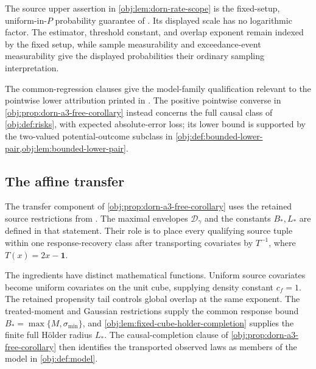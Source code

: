 
The source upper assertion in \cref{obj:lem:dorn-rate-scope} is the fixed-setup, uniform-in-\(P\) probability guarantee of \citet[Theorem 1(ii), author PDF p.~12; proof of Theorem 1, pp.~27--28]{Dorn2026GlobalOverlap}. Its displayed scale has no logarithmic factor. The estimator, threshold constant, and overlap exponent remain indexed by the fixed setup, while sample measurability and exceedance-event measurability give the displayed probabilities their ordinary sampling interpretation.

The common-regression clauses give the model-family qualification relevant to the pointwise lower attribution printed in \citet[Theorem 1(i), author PDF p.~12]{Dorn2026GlobalOverlap}. The positive pointwise converse in \cref{obj:prop:dorn-a3-free-corollary} instead concerns the full causal class of \cref{obj:def:risks}, with expected absolute-error loss; its lower bound is supported by the two-valued potential-outcome subclass in \cref{obj:def:bounded-lower-pair,obj:lem:bounded-lower-pair}.

\subsection{The affine transfer}

The transfer component of \cref{obj:prop:dorn-a3-free-corollary} uses the retained source restrictions from \citet[Section 2, Assumptions 1--2, author PDF pp.~3--7]{Dorn2026GlobalOverlap}. The maximal envelopes \(\mathcal D_\gamma\) and the constants \(B_*,L_*\) are defined in that statement. Their role is to place every qualifying source tuple within one response-recovery class after transporting covariates by \(T^{-1}\), where \(T(x)=2x-\mathbf1\).

The ingredients have distinct mathematical functions. Uniform source covariates become uniform covariates on the unit cube, supplying density constant \(c_f=1\). The retained propensity tail controls global overlap at the same exponent. The treated-moment and Gaussian restrictions supply the common response bound \(B_*=\max\{M,\sigma_{\min}\}\), and \cref{obj:lem:fixed-cube-holder-completion} supplies the finite full Hölder radius \(L_*\). The causal-completion clause of \cref{obj:prop:dorn-a3-free-corollary} then identifies the transported observed laws as members of the model in \cref{obj:def:model}.

